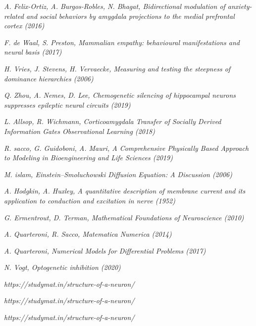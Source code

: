 \documentclass[12pt, a4paper]{report}
\begin{document}
\begin{thebibliography}{50}
	\textit{A. Felix-Ortiz, A. Burgos-Robles, N. Bhagat, Bidirectional modulation of anxiety-related and social behaviors by amygdala projections to the medial prefrontal cortex  (2016)}
	
	\textit{F. de Waal, S. Preston, Mammalian empathy: behavioural manifestations and neural basis (2017)}
	
	\textit{H. Vries, J. Stevens, H. Vervaecke, Measuring and testing the steepness of dominance hierarchies (2006)}
	
	\textit{Q. Zhou, A. Nemes, D. Lee, Chemogenetic silencing of hippocampal neurons suppresses epileptic neural circuits (2019)}
	
	\textit{L. Allsop, R. Wichmann, Corticoamygdala Transfer of Socially Derived Information Gates Observational Learning (2018)}
	
	\textit{R. sacco, G. Guidoboni, A. Mauri, A Comprehensive Physically Based Approach to Modeling in Bioengineering and Life Sciences (2019)}
	
	\textit{M. islam, Einstein–Smoluchowski Diffusion Equation: A Discussion (2006)}
	
	\textit{A. Hodgkin, A. Huxley, A quantitative description of membrane current and its application to conduction 
		and excitation in nerve (1952)}
	
	\textit{G. Ermentrout, D. Terman, Mathematical Foundations of Neuroscience (2010)}
	
	\textit{A. Quarteroni, R. Sacco, Matematica Numerica (2014)}
	
	\textit{A. Quarteroni, Numerical Models for Differential Problems (2017)}
	
	\textit{N. Vogt, Optogenetic inhibition (2020)}
	
	\textit{https://studymat.in/structure-of-a-neuron/}
	
	\textit{https://studymat.in/structure-of-a-neuron/}
	
	\textit{https://studymat.in/structure-of-a-neuron/}
	
	
\end{thebibliography}
\end{document}
